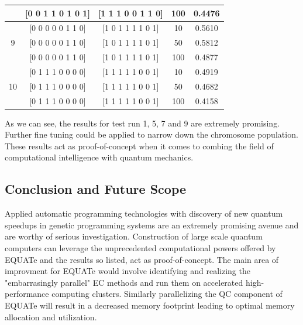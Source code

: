 \documentclass[conference]{IEEEtran}
\begin{document}
\begin{table}[!t]
{\begin{tabular}{| c | c | c | c | c |}
 & [0 0 1 1 0 1 0 1] & [1 1 1 0 0 1 1 0] & 100 & 0.4476 \\
\hline
 & [0 0 0 0 0 1 1 0] & [1 0 1 1 1 1 0 1] & 10 & 0.5610 \\
9 & [0 0 0 0 0 1 1 0] & [1 0 1 1 1 1 0 1] & 50 & 0.5812 \\
 & [0 0 0 0 0 1 1 0] & [1 0 1 1 1 1 0 1] & 100 & 0.4877 \\
\hline
 & [0 1 1 1 0 0 0 0] & [1 1 1 1 1 0 0 1] & 10  & 0.4919 \\
10 & [0 1 1 1 0 0 0 0] & [1 1 1 1 1 0 0 1] & 50  & 0.4682 \\
 & [0 1 1 1 0 0 0 0] & [1 1 1 1 1 0 0 1] & 100  & 0.4158 \\
\hline
\end{tabular}
}
\end{table}

As we can see, the results for test run 1, 5, 7 and 9 are extremely promising. Further fine tuning could be applied to narrow down the chromosome population. These results act as proof-of-concept when it comes to combing the field of computational intelligence with quantum mechanics. 

\subsection{Conclusion and Future Scope}

Applied automatic programming technologies with discovery of new quantum speedups in genetic programming systems are an extremely promising avenue and are worthy of serious investigation. Construction of large scale quantum computers can leverage the unprecedented computational powers offered by EQUATe and the results so listed, act as proof-of-concept. The main area of improvment for EQUATe would involve identifying and realizing the "embarrasingly parallel" EC methods and run them on accelerated high-performance computing clusters. Similarly parallelizing the QC component of EQUATe will result in a decreased memory footprint leading to optimal memory allocation and utilization.
\end{document}
